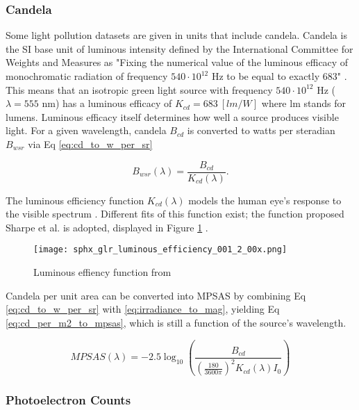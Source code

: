 \subsubsection{Candela} \label{sec:candela}

Some light pollution datasets are given in units that include candela. Candela is the SI base unit of luminous intensity defined by the International Committee for Weights and Measures as "Fixing the numerical value of the luminous efficacy of monochromatic radiation of frequency $540\cdot10^{12}$ Hz to be equal to exactly $683$" \cite{nist_units}. This means that an isotropic green light source with frequency $540\cdot10^{12}$ Hz ($\lambda = 555$ nm) has a luminous efficacy of $K_{cd} = 683 \: \left[ lm/W \right]$ where lm stands for lumens. Luminous efficacy itself determines how well a source produces visible light. For a given wavelength, candela $B_{cd}$ is converted to watts per steradian $B_{wsr}$ via Eq \ref{eq:cd_to_w_per_sr} \cite{nist_units}

\begin{equation} \label{eq:cd_to_w_per_sr}
  B_{wsr}(\lambda) = \frac{B_{cd}}{K_{cd}(\lambda)}.
\end{equation}

The luminous efficiency function $K_{cd}(\lambda)$ models the human eye's response to the visible spectrum \cite{sharpe2005}. Different fits of this function exist; the function proposed Sharpe et al. is adopted, displayed in Figure \ref{fig:luminous_efficiency} \cite{sharpe2005}.

\begin{figure}[ht]
  \centering
  \texttt{[image: sphx\_glr\_luminous\_efficiency\_001\_2\_00x.png]}
  \caption{Luminous effiency function from \cite{sharpe2005}}
  \label{fig:luminous_efficiency}
\end{figure}

Candela per unit area can be converted into MPSAS by combining Eq \ref{eq:cd_to_w_per_sr} with \ref{eq:irradiance_to_mag}, yielding Eq \ref{eq:cd_per_m2_to_mpsas}, which is still a function of the source's wavelength.

\begin{equation} \label{eq:cd_per_m2_to_mpsas}
  MPSAS(\lambda) = -2.5 \log_{10}\left( \frac{B_{cd}}{\left( \frac{180}{ 3600\pi} \right)^2 K_{cd}(\lambda) I_0} \right)
\end{equation}

\subsubsection{Photoelectron Counts}

